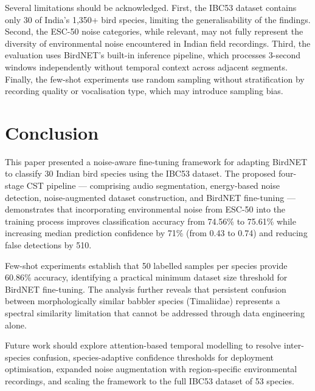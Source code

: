 \documentclass[conference]{IEEEtran}
\begin{document}
Several limitations should be acknowledged. First, the IBC53 dataset contains only 30 of India's 1,350+ bird species, limiting the generalisability of the findings. Second, the ESC-50 noise categories, while relevant, may not fully represent the diversity of environmental noise encountered in Indian field recordings. Third, the evaluation uses BirdNET's built-in inference pipeline, which processes 3-second windows independently without temporal context across adjacent segments. Finally, the few-shot experiments use random sampling without stratification by recording quality or vocalisation type, which may introduce sampling bias.

\section{Conclusion}

This paper presented a noise-aware fine-tuning framework for adapting BirdNET to classify 30 Indian bird species using the IBC53 dataset. The proposed four-stage CST pipeline --- comprising audio segmentation, energy-based noise detection, noise-augmented dataset construction, and BirdNET fine-tuning --- demonstrates that incorporating environmental noise from ESC-50 into the training process improves classification accuracy from 74.56\% to 75.61\% while increasing median prediction confidence by 71\% (from 0.43 to 0.74) and reducing false detections by 510.

Few-shot experiments establish that 50 labelled samples per species provide 60.86\% accuracy, identifying a practical minimum dataset size threshold for BirdNET fine-tuning. The analysis further reveals that persistent confusion between morphologically similar babbler species (Timaliidae) represents a spectral similarity limitation that cannot be addressed through data engineering alone.

Future work should explore attention-based temporal modelling to resolve inter-species confusion, species-adaptive confidence thresholds for deployment optimisation, expanded noise augmentation with region-specific environmental recordings, and scaling the framework to the full IBC53 dataset of 53 species.
\end{document}
